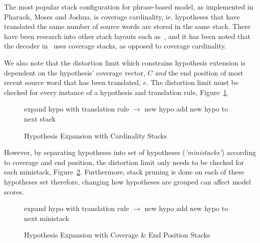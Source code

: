 \documentclass[11pt]{article}
\begin{document}
The most popular stack configuration for phrase-based model, as implemented in Pharaoh, Moses and Joshua, is coverage cardinality, ie. hypotheses that have translated the same number of source words are stored in the same stack. There have been research into other stack layouts such as~\cite{ortizmartinez-garciavarea-casacuberta:2006:WMT}, and it has been noted that the decoder in~\cite{Brown:1993} uses coverage stacks, as opposed to coverage cardinality. 

We also note that the distortion limit which constrains hypothesis extension is dependent on the hypothesis' coverage vector, $C$ \emph{and} the end position of most recent source word that has been translated, $e$. The distortion limit must be checked for every instance of a hypothesis and translation rule, Figure~\ref{algo:Hypothesis Expansion with Unsorted Stack}.
\begin{figure} [h]
\begin{algorithmic}
	\STATE expand hypo with translation rule $\rightarrow$ new hypo
	\STATE add new hypo to next stack
      \ENDIF
  \ENDFOR %
\ENDFOR %
\end{algorithmic}
\caption{Hypothesis Expansion with Cardinality Stacks}
\label{algo:Hypothesis Expansion with Unsorted Stack}
\end{figure}
However, by separating hypotheses into set of hypotheses (\emph{'ministacks'}) according to coverage and end position, the distortion limit only needs to be checked for each ministack, Figure~\ref{algo:Hypothesis Expansion with Sorted Stack}. Furthermore, stack pruning is done on each of these hypotheses set therefore, changing how hypotheses are grouped can affect model scores. 
\begin{figure} [h]
\begin{algorithmic}
	\STATE expand hypo with translation rule $\rightarrow$ new hypo
	\STATE add new hypo to next ministack
      \ENDFOR
    \ENDIF
  \ENDFOR %
\ENDFOR %
\end{algorithmic}
\caption{Hypothesis Expansion with Coverage \& End Position Stacks}
\label{algo:Hypothesis Expansion with Sorted Stack}
\end{figure}
\end{document}

